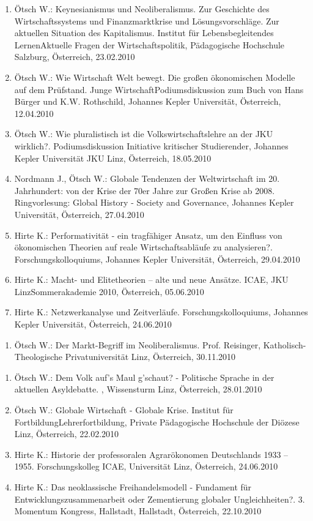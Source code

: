 \begin{enumerate}
	\item Ötsch W.: Keynesianismus und Neoliberalismus. Zur Geschichte des Wirtschaftssystems und Finanzmarktkrise und Lösungsvorschläge. Zur aktuellen Situation des Kapitalismus. Institut für Lebensbegleitendes LernenAktuelle Fragen der Wirtschaftspolitik, Pädagogische Hochschule Salzburg, Österreich, 23.02.2010
	\item Ötsch W.: Wie Wirtschaft Welt bewegt. Die großen ökonomischen Modelle auf dem Prüfstand. Junge WirtschaftPodiumsdiskussion zum Buch von Hans Bürger und K.W. Rothschild, Johannes Kepler Universität, Österreich, 12.04.2010
	\item Ötsch W.: Wie pluralistisch ist die Volkswirtschaftslehre an der JKU wirklich?. Podiumsdiskussion Initiative kritischer Studierender, Johannes Kepler Universität JKU Linz, Österreich, 18.05.2010
	\item Nordmann J., Ötsch W.: Globale Tendenzen der Weltwirtschaft im 20. Jahrhundert: von der Krise der 70er Jahre zur Großen Krise ab 2008. Ringvorlesung: Global History - Society and Governance, Johannes Kepler Universität, Österreich, 27.04.2010
	\item Hirte K.: Performativität - ein tragfähiger Ansatz, um den Einfluss von ökonomischen Theorien auf reale Wirtschaftsabläufe zu analysieren?. Forschungskolloquiums, Johannes Kepler Universität, Österreich, 29.04.2010
	\item Hirte K.: Macht- und Elitetheorien – alte und neue Ansätze. ICAE, JKU LinzSommerakademie 2010, Österreich, 05.06.2010
	\item Hirte K.: Netzwerkanalyse und Zeitverläufe. Forschungskolloquiums, Johannes Kepler Universität, Österreich, 24.06.2010
\end{enumerate}

\begin{enumerate}
	\item Ötsch W.: Der Markt-Begriff im Neoliberalismus. Prof. Reisinger, Katholisch-Theologische Privatuniversität Linz, Österreich, 30.11.2010
\end{enumerate}

\begin{enumerate}
	\item Ötsch W.: Dem Volk auf's Maul g'schaut? - Politische Sprache in der aktuellen Asyldebatte. , Wissensturm Linz, Österreich, 28.01.2010
	\item Ötsch W.: Globale Wirtschaft - Globale Krise. Institut für FortbildungLehrerfortbildung, Private Pädagogische Hochschule der Diözese Linz, Österreich, 22.02.2010
	\item Hirte K.: Historie der professoralen Agrarökonomen Deutschlands 1933 – 1955. Forschungskolleg ICAE, Universität Linz, Österreich, 24.06.2010
	\item Hirte K.: Das neoklassische Freihandelsmodell - Fundament für Entwicklungszusammenarbeit oder Zementierung globaler Ungleichheiten?. 3. Momentum Kongress, Hallstadt, Hallstadt, Österreich, 22.10.2010
\end{enumerate}

